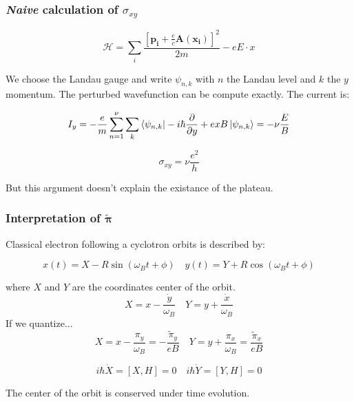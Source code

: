 \documentclass{beamer}
\begin{document}
\begin{frame}
\frametitle{\emph{Naive} calculation of $\sigma_{xy}$}
\begin{center}

\[
\mathcal{H} = \sum_i \frac{\left[ \mathbf{p_i} + \frac{e}{c} \mathbf{A} \left( \mathbf{x_i} \right) \right] ^2}{2 m} - e E \cdot x
\]

We choose the Landau gauge and write $\psi_{n, k}$ with $n$ the Landau level and $k$ the $y$ momentum. The perturbed wavefunction can be compute exactly. The current is:

\[
I_y = - \frac{e}{m} \sum_{n = 1}^{\nu} \sum_{k} \bra{\psi_{n, k}} - i \hbar \frac{\partial}{\partial y} + e x B \ket{\psi_{n, k}} = - \nu \frac{E}{B}
\]

\[
\sigma_{xy} = \nu \frac{e^2}{h}
\]

But this argument doesn't explain the existance of the plateau.

\end{center}
\end{frame}


\begin{frame}
\frametitle{Interpretation of $\mathbf{\tilde{\pi}}$}
\begin{center}

Classical electron following a cyclotron orbits is described by:

\[
x(t) = X - R \sin \left( \omega_B t + \phi \right) \quad 
y(t) = Y + R \cos \left( \omega_B t + \phi \right)
\]

where $X$ and $Y$ are the coordinates center of the orbit.
\[
X = x - \frac{\dot{y}}{\omega_B} \quad 
Y = y + \frac{\dot{x}}{\omega_B}
\]
If we quantize...
\[ X = x - \frac{\pi_y}{\omega_B} = -\frac{\tilde{\pi}_y}{e B} \quad Y = y + \frac{\pi_x}{\omega_B} = \frac{\tilde{\pi}_x}{eB} \]

\[
i \hbar \dot{X} = [X, H] = 0 \quad i \hbar \dot{Y} = [Y, H] = 0
\]

The center of the orbit is conserved under time evolution.



\end{center}
\end{frame}
\end{document}
